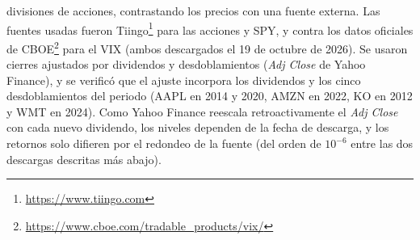 divisiones de acciones, contrastando los precios con una fuente externa. Las fuentes usadas fueron Tiingo\footnote{\url{https://www.tiingo.com}} para las acciones y SPY, y contra los datos oficiales de CBOE\footnote{\url{https://www.cboe.com/tradable_products/vix/}} para el VIX (ambos descargados el 19 de octubre de 2026). Se usaron cierres ajustados por dividendos y desdoblamientos (\emph{Adj Close} de Yahoo Finance), y se verificó que el ajuste incorpora los dividendos y los cinco desdoblamientos del periodo (AAPL en 2014 y 2020, AMZN en 2022, KO en 2012 y WMT en 2024). Como Yahoo Finance reescala retroactivamente el \emph{Adj Close} con cada nuevo dividendo, los niveles dependen de la fecha de descarga, y los retornos solo difieren por el redondeo de la fuente (del orden de $10^{-6}$ entre las dos descargas descritas más abajo).

